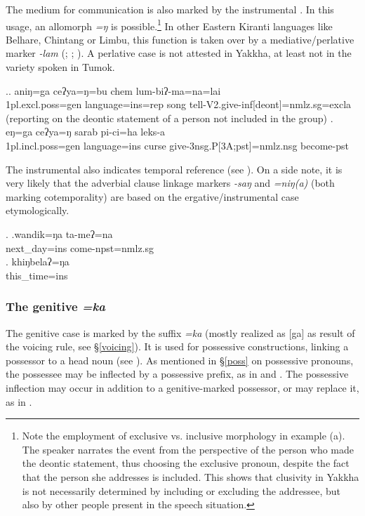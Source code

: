 		
The medium for communication is also marked by the instrumental \Next. In this usage, an allomorph \emph{=ŋ} is possible.\footnote{Note the employment of exclusive vs. inclusive morphology in example (a). The speaker narrates the event from the perspective of the person who made the deontic statement, thus choosing the exclusive pronoun, despite the fact that the person she addresses is included. This shows that clusivity in Yakkha is not necessarily determined by including or excluding the addressee, but also by other people present in the speech situation.} In other Eastern Kiranti languages like Belhare, Chintang or Limbu, this function is taken over by a mediative/perlative marker \emph{-lam} (\citealt[549]{Bickel2003Belhare}; \citealt[83]{Schikowski2012_Morphology}; \citealt[51]{Driem1987A-grammar}). A perlative case is not attested in Yakkha, at least not in the variety spoken in Tumok.

\ex.\ag. aniŋ=ga ceʔya=ŋ=bu chem lum-biʔ-ma=na=lai\\
{\sc 1pl.excl.poss=gen} language{\sc =ins=rep} song tell{\sc -V2.give-inf[deont]=nmlz.sg=excla}\\
 (reporting on the deontic statement of a person not included in the group) 
\bg. eŋ=ga            ceʔya=ŋ       sarab pi-ci=ha leks-a\\
		{\sc 1pl.incl.poss=gen} language{\sc =ins} curse give{\sc -3nsg.P[3A;pst]=nmlz.nsg} become{\sc [3sg]-pst}\\
		
		
The instrumental also indicates temporal reference (see \Next). On a side note,  it is very likely that the adverbial clause linkage markers  \emph{-saŋ} and \emph{=niŋ(a)} (both marking cotemporality)  are based on the ergative/instrumental case etymologically.
		
		\ex. \ag.wandik=ŋa ta-meʔ=na\\
		next\_day{\sc =ins} come{\sc [3sg]-npst=nmlz.sg}\\
		\bg. khiŋbelaʔ=ŋa\\
		this\_time{\sc =ins}\\
	
	
\subsubsection{The genitive \emph{=ka} }\label{case-gen}		
The genitive case is marked by the suffix \emph{=ka} (mostly realized as [ga] as  result of the voicing rule, see §\ref{voicing}). It is used for possessive constructions, linking a possessor to a head noun (see \Next). As mentioned in §\ref{poss} on possessive pronouns, the possessee may be inflected by a possessive prefix, as in \Next[b] and \Next[c]. The possessive inflection may occur in addition to a genitive-marked possessor, or may replace it, as in \Next[c].

